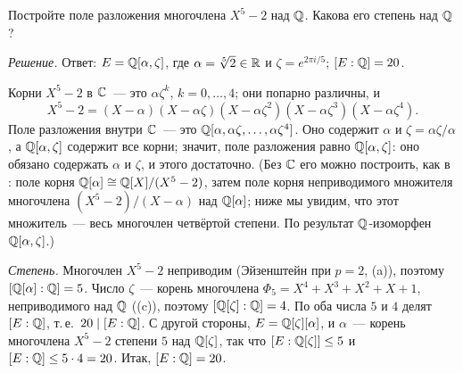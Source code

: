 \begin{exercise}[2-3]
Постройте поле разложения многочлена $X^5-2$ над $\mathbb Q$. Какова его степень над $\mathbb Q$?
\end{exercise}

\noindent\emph{Решение.} Ответ: $E=\mathbb Q[\alpha,\zeta]$, где $\alpha=\sqrt[5]2\in\mathbb R$ и $\zeta=e^{2\pi i/5}$;
$[E:\mathbb Q]=20$.

Корни $X^5-2$ в $\mathbb C$~--- это $\alpha\zeta^k$, $k=0,\dots,4$; они попарно различны, и
\[
X^5-2=(X-\alpha)(X-\alpha\zeta)(X-\alpha\zeta^2)(X-\alpha\zeta^3)(X-\alpha\zeta^4).
\]
Поле разложения внутри $\mathbb C$~--- это $\mathbb Q[\alpha,\alpha\zeta,\dots,\alpha\zeta^4]$. Оно содержит $\alpha$ и
$\zeta=\alpha\zeta/\alpha$, а $\mathbb Q[\alpha,\zeta]$ содержит все корни; значит, поле разложения равно $\mathbb Q[\alpha,\zeta]$:
оно обязано содержать $\alpha$ и $\zeta$, и этого достаточно. (Без $\mathbb C$ его можно построить, как в : поле корня
$\mathbb Q[\alpha]\cong\mathbb Q[X]/(X^5-2)$, затем поле корня неприводимого множителя многочлена $(X^5-2)/(X-\alpha)$ над $\mathbb Q[\alpha]$; ниже
мы увидим, что этот множитель~--- весь многочлен четвёртой степени. По  результат $\mathbb Q$-изоморфен
$\mathbb Q[\alpha,\zeta]$.)

\emph{Степень.} Многочлен $X^5-2$ неприводим (Эйзенштейн при $p=2$, (a)), поэтому $[\mathbb Q[\alpha]:\mathbb Q]=5$. Число
$\zeta$~--- корень многочлена $\Phi_5=X^4+X^3+X^2+X+1$, неприводимого над $\mathbb Q$ ((c)), поэтому
$[\mathbb Q[\zeta]:\mathbb Q]=4$. По  оба числа $5$ и $4$ делят $[E:\mathbb Q]$, т.\,е.\ $20\mid[E:\mathbb Q]$. С другой стороны,
$E=\mathbb Q[\zeta][\alpha]$, и $\alpha$~--- корень многочлена $X^5-2$ степени $5$ над $\mathbb Q[\zeta]$, так что $[E:\mathbb Q[\zeta]]\le5$ и
$[E:\mathbb Q]\le5\cdot4=20$. Итак, $[E:\mathbb Q]=20$.

\par\noindent\begin{minipage}{\linewidth}
\begin{center}
\end{center}
\end{minipage}\par\medskip

